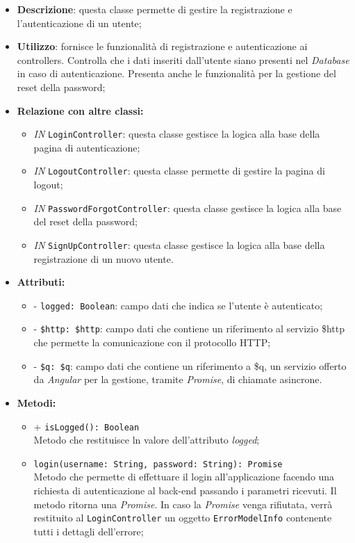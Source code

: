 \begin{itemize}
	\item \textbf{Descrizione}: questa classe permette di gestire la registrazione e l'autenticazione di un utente;
	\item \textbf{Utilizzo}: fornisce le funzionalità di registrazione e autenticazione ai controllers. Controlla che i dati inseriti dall'utente siano presenti nel \textit{Database} in caso di autenticazione. Presenta anche le funzionalità per la gestione del reset della password;
	\item \textbf{Relazione con altre classi:}
	\begin{itemize}
		\item \textit{IN} \texttt{LoginController}: questa classe gestisce la logica alla base della pagina di autenticazione;
		\item \textit{IN} \texttt{LogoutController}: questa classe permette di gestire la pagina di logout;
		\item \textit{IN} \texttt{PasswordForgotController}: questa classe gestisce la logica alla base del reset della password;
		\item \textit{IN} \texttt{SignUpController}: questa classe gestisce la logica alla base della registrazione di un nuovo utente.
	\end{itemize}
	\item \textbf{Attributi:}
	\begin{itemize}
		\item - \texttt{logged: Boolean}: campo dati che indica se l'utente è autenticato;
		\item - \texttt{\$http: \$http}: campo dati che contiene un riferimento al servizio \$http che permette la comunicazione con il protocollo HTTP;
		\item - \texttt{\$q: \$q}: campo dati che contiene un riferimento a \$q, un servizio offerto da \textit{Angular} per la gestione, tramite \textit{Promise}, di chiamate asincrone.
	\end{itemize}
	\item \textbf{Metodi:}
	\begin{itemize}
		\item + \texttt{isLogged(): Boolean} \\ Metodo che restituisce ln valore dell'attributo \textit{logged};
		\item \texttt{login(username: String, password: String): Promise}\\ Metodo che permette di effettuare il login all'applicazione facendo una richiesta di autenticazione al back-end passando i parametri ricevuti. Il metodo ritorna una \textit{Promise}. In caso la \textit{Promise} venga rifiutata, verrà restituito al \texttt{LoginController} un oggetto \texttt{ErrorModelInfo} contenente tutti i dettagli dell'errore; \\

\end{itemize}
\end{itemize}
